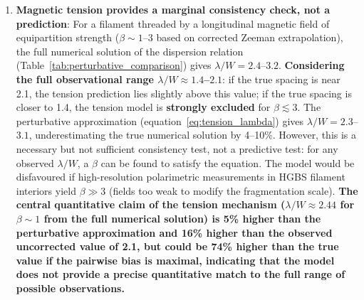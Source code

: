 \documentclass[11pt,a4paper]{article}
\begin{document}
\begin{enumerate}
    \textbf{Hierarchical fragmentation provides the most parsimonious explanation}: The observation by \citet{Yang2024} that fiber-to-core spacing in Orion B recovers the classical $4\times$ prediction suggests that the apparent sub-Jeans spacing at the filament level may reflect projection/averaging effects from measuring across hierarchical structures rather than a true modified fragmentation wavelength. A simple geometric model predicts that spacing measured across multiple superposed fibers with intrinsic $4\times$ spacing could be compressed, giving values broadly consistent with the observed range for $N_{\rm fiber} \approx 3$--$4$ fibers. \textbf{Considering the full observational range $\lambda/W \approx 1.4$--$2.1$}, the hierarchical interpretation is qualitatively consistent with the upper portion of this range but could be inconsistent if the true spacing is closer to 1.4. However, the compression factor has not been validated for the specific observational methodology used here, and the apparent quantitative agreement should be interpreted as order-of-magnitude plausibility rather than precise agreement. This interpretation does not require modified fragmentation physics beyond the classical IM92 theory and is directly supported by observations. Fiber-resolved core spacing analysis in HGBS filaments is the single most critical test to distinguish this from the modified fragmentation scale interpretation.

    \item \textbf{Magnetic tension provides a marginal consistency check, not a prediction}: For a filament threaded by a longitudinal magnetic field of equipartition strength ($\beta \sim 1$--$3$ based on corrected Zeeman extrapolation), the full numerical solution of the dispersion relation (Table~\ref{tab:perturbative_comparison}) gives $\lambda/W = 2.4$--$3.2$. \textbf{Considering the full observational range $\lambda/W \approx 1.4$--$2.1$}: if the true spacing is near 2.1, the tension prediction lies slightly above this value; if the true spacing is closer to 1.4, the tension model is \textbf{strongly excluded} for $\beta \lesssim 3$. The perturbative approximation (equation~\ref{eq:tension_lambda}) gives $\lambda/W = 2.3$--$3.1$, underestimating the true numerical solution by 4--10\%. However, this is a necessary but not sufficient consistency test, not a predictive test: for any observed $\lambda/W$, a $\beta$ can be found to satisfy the equation. The model would be disfavoured if high-resolution polarimetric measurements in HGBS filament interiors yield $\beta \gg 3$ (fields too weak to modify the fragmentation scale). \textbf{The central quantitative claim of the tension mechanism ($\lambda/W \approx 2.44$ for $\beta \sim 1$ from the full numerical solution) is 5\% higher than the perturbative approximation and 16\% higher than the observed uncorrected value of 2.1, but could be 74\% higher than the true value if the pairwise bias is maximal, indicating that the model does not provide a precise quantitative match to the full range of possible observations.}


\end{enumerate}
\end{document}
